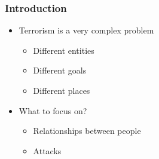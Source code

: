 \begin{frame}
\frametitle{Introduction}

\begin{itemize}
	\item Terrorism is a very complex problem
	\begin{itemize}
		\item Different entities
		\item Different goals
		\item Different places
	\end{itemize}
	\item What to focus on?
	\begin{itemize}
		\item Relationships between people
		\item Attacks
	\end{itemize}
\end{itemize}

\end{frame}